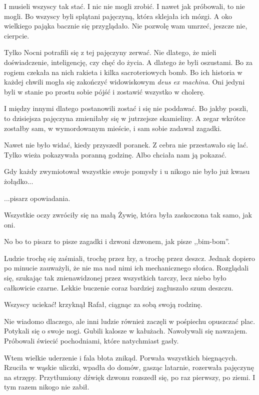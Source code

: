 I musieli wszyscy tak stać.
I nic nie mogli zrobić.
I nawet jak próbowali, to nie mogli.
Bo wszyscy byli splątani pajęczyną, która sklejała ich mózgi.
A oko wielkiego pająka bacznie się przyglądało.
Nie pozwolę wam umrzeć, jeszcze nie, cierpcie.

Tylko Nocni potrafili się z tej pajęczyny zerwać.
Nie dlatego, że mieli doświadczenie, inteligencję, czy chęć do życia.
A dlatego że byli oszustami.
Bo za rogiem czekała na nich rakieta i kilka sacroteriowych bomb.
Bo ich historia w każdej chwili mogła się zakończyć widowiskowym \emph{deus ex machina}.
Oni jedyni byli w stanie po prostu sobie pójść i zostawić wszystko w cholerę.

I między innymi dlatego postanowili zostać i się nie poddawać.
Bo jakby poszli, to dzisiejsza pajęczyna zmieniłaby się w jutrzejsze skamieliny.
A zegar wkrótce zostałby sam, w wymordowanym mieście, i sam sobie zadawał zagadki.

Nawet nie było widać, kiedy przyszedł poranek.
Z cebra nie przestawało się lać.
Tylko wieża pokazywała poranną godzinę. Albo chciała nam ją pokazać.

Gdy każdy zwymiotował wszystkie swoje pomysły i u nikogo nie było już kwasu żołądko...
\begin{dialogue}
	\ds{} ...pisarz opowiadania.
\end{dialogue}
Wszystkie oczy zwróciły się na małą Żywię, która była zaskoczona tak samo, jak oni.
\begin{dialogue}
	\ds{} No bo to pisarz to pisze zagadki i dzwoni dzwonem, jak pisze ,,bim-bom''.
\end{dialogue}
Ludzie trochę się zaśmiali, trochę przez łzy, a trochę przez deszcz.
Jednak dopiero po minucie zauważyli, że nie ma nad nimi ich mechanicznego słońca.
Rozglądali się, szukając tak znienawidzonej przez wszystkich tarczy, lecz niebo było całkowicie czarne.
Lekkie buczenie coraz bardziej zagłuszało szum deszczu.
\begin{dialogue}
	\ds{} Wszyscy uciekać! \dm{} krzyknął Rafał, ciągnąc za sobą swoją rodzinę.
\end{dialogue}
Nie wiadomo dlaczego, ale inni ludzie również zaczęli w pośpiechu opuszczać plac.
Potykali się o swoje nogi.
Gubili kalosze w kałużach.
Nawoływali się nawzajem.
Próbowali świecić pochodniami, które natychmiast gasły.

Wtem wielkie uderzenie i fala błota znikąd.  
Porwała wszystkich biegnących.
Rzuciła w wąskie uliczki, wpadła do domów, gasząc latarnie, rozerwała pajęczynę na strzępy.
Przytłumiony dźwięk dzwonu rozszedł się, po raz pierwszy, po ziemi.
I tym razem nikogo nie zabił.


















